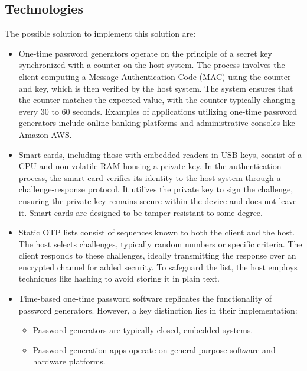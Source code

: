 \subsection{Technologies}
The possible solution to implement this solution are: 
\begin{itemize}
    \item One-time password generators operate on the principle of a secret key synchronized with a counter on the host system. 
        The process involves the client computing a Message Authentication Code (MAC) using the counter and key, which is then verified by the host system. 
        The system ensures that the counter matches the expected value, with the counter typically changing every 30 to 60 seconds.
        Examples of applications utilizing one-time password generators include online banking platforms and administrative consoles like Amazon AWS.
    \item Smart cards, including those with embedded readers in USB keys, consist of a CPU and non-volatile RAM housing a private key. 
        In the authentication process, the smart card verifies its identity to the host system through a challenge-response protocol. 
        It utilizes the private key to sign the challenge, ensuring the private key remains secure within the device and does not leave it. 
        Smart cards are designed to be tamper-resistant to some degree.
    \item Static OTP lists consist of sequences known to both the client and the host. 
        The host selects challenges, typically random numbers or specific criteria. 
        The client responds to these challenges, ideally transmitting the response over an encrypted channel for added security. 
        To safeguard the list, the host employs techniques like hashing to avoid storing it in plain text.
    \item Time-based one-time password software replicates the functionality of password generators. 
        However, a key distinction lies in their implementation:
        \begin{itemize}
            \item Password generators are typically closed, embedded systems.
            \item Password-generation apps operate on general-purpose software and hardware platforms.
        \end{itemize}
\end{itemize}